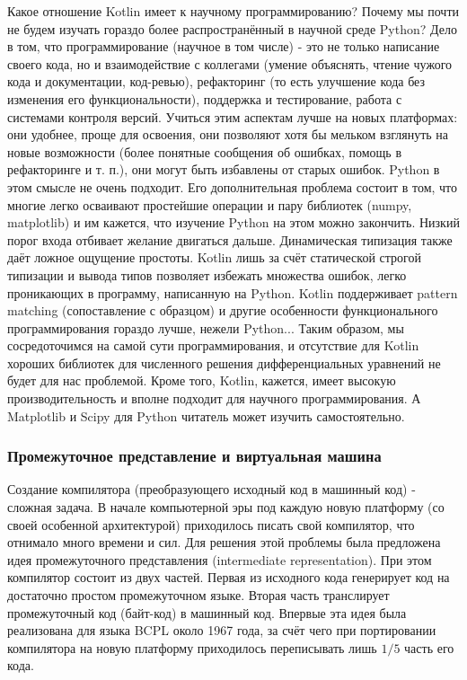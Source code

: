 \documentclass{book}
\begin{document}
Какое отношение Kotlin имеет к научному программированию? Почему мы почти не будем изучать гораздо
более распространённый в научной среде Python? Дело в том, что программирование (научное в том числе) - это не
только написание своего кода, но и взаимодействие с коллегами (умение объяснять, чтение чужого кода
и документации, код-ревью), рефакторинг (то есть улучшение кода без изменения его
функциональности), поддержка и тестирование, работа с системами контроля версий. Учиться этим
аспектам лучше на новых платформах: они удобнее, проще для освоения, они позволяют хотя бы мельком
взглянуть на новые возможности (более понятные сообщения об ошибках, помощь в рефакторинге и т.
п.), они могут быть избавлены от старых ошибок. Python в этом смысле не очень подходит. Его
дополнительная проблема состоит в том, что многие легко осваивают простейшие операции и пару библиотек (numpy,
matplotlib) и им кажется, что изучение Python на этом можно закончить. Низкий порог входа отбивает
желание двигаться дальше. Динамическая типизация также даёт ложное ощущение простоты. Kotlin лишь
за счёт статической строгой типизации и вывода типов позволяет избежать множества ошибок, легко
проникающих в программу, написанную на Python. Kotlin поддерживает pattern matching (сопоставление
с образцом) и другие особенности функционального программирования гораздо лучше, нежели Python...
Таким образом,  мы сосредоточимся на  самой сути программирования, и отсутствие для Kotlin хороших
библиотек для численного решения дифференциальных уравнений не будет для
нас проблемой. Кроме того, Kotlin, кажется, имеет высокую производительность и вполне подходит для
научного программирования. А Matplotlib и Scipy для Python читатель может изучить самостоятельно.


\subsubsection{Промежуточное представление и виртуальная машина}

Создание компилятора (преобразующего исходный код в машинный код) - сложная задача. В начале
компьютерной эры под каждую новую платформу (со своей особенной архитектурой) приходилось писать
свой компилятор, что отнимало много времени и сил. Для решения этой проблемы была предложена идея
промежуточного представления (intermediate representation). При этом компилятор состоит из двух
частей. Первая из исходного кода генерирует код на достаточно простом промежуточном языке. Вторая
часть транслирует промежуточный код (байт-код) в машинный код. Впервые эта идея была реализована
для языка BCPL около 1967 года, за счёт чего при портировании компилятора на новую платформу
приходилось переписывать лишь $1/5$ часть его кода.
\end{document}

